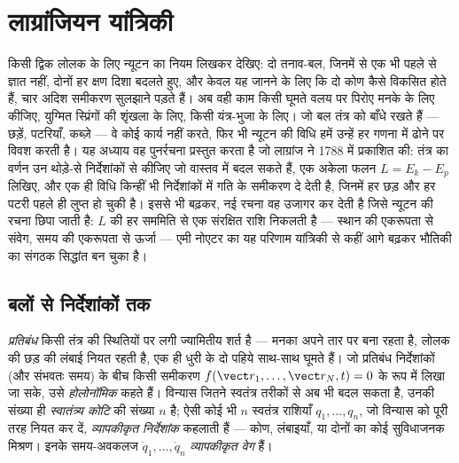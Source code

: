 \chapter{लाग्रांजियन यांत्रिकी}\label{ch:b3:lagrangian-mechanics}

किसी द्विक लोलक के लिए न्यूटन का नियम लिखकर देखिए: दो तनाव-बल, जिनमें
से एक भी पहले से ज्ञात नहीं, दोनों हर क्षण दिशा बदलते हुए, और केवल यह
जानने के लिए कि दो कोण कैसे विकसित होते हैं, चार अदिश समीकरण सुलझाने
पड़ते हैं। अब वही काम किसी घूमते वलय पर पिरोए मनके के लिए कीजिए, युग्मित
स्प्रिंगों की शृंखला के लिए, किसी यंत्र-भुजा के लिए। जो बल तंत्र को
बाँधे रखते हैं --- छड़ें, पटरियाँ, कब्ज़े --- वे कोई कार्य नहीं करते,
फिर भी न्यूटन की विधि हमें उन्हें हर गणना में ढोने पर विवश करती है। यह
अध्याय वह पुनर्रचना प्रस्तुत करता है जो लाग्रांज ने 1788 में प्रकाशित
की: तंत्र का वर्णन उन थोड़े-से निर्देशांकों से कीजिए जो वास्तव में बदल
सकते हैं, एक अकेला फलन $L = E_k - E_p$ लिखिए, और एक ही विधि किन्हीं भी
निर्देशांकों में गति के समीकरण दे देती है, जिनमें हर छड़ और हर पटरी पहले
ही लुप्त हो चुकी है। इससे भी बढ़कर, नई रचना वह उजागर कर देती है जिसे
न्यूटन की रचना छिपा जाती है: $L$ की हर सममिति से एक संरक्षित राशि निकलती
है --- स्थान की एकरूपता से संवेग, समय की एकरूपता से ऊर्जा --- एमी नोएटर
का यह परिणाम यांत्रिकी से कहीं आगे बढ़कर भौतिकी का संगठक सिद्धांत बन
चुका है।

\section{बलों से निर्देशांकों तक}

\begin{definition}[प्रतिबंध, स्वातंत्र्य कोटि, व्यापकीकृत निर्देशांक]\label{def:b3:lagrangian-mechanics:coordinates}
\emph{प्रतिबंध} किसी तंत्र की स्थितियों पर लगी ज्यामितीय शर्त है ---
मनका अपने तार पर बना रहता है, लोलक की छड़ की लंबाई नियत रहती है, एक ही
धुरी के दो पहिये साथ-साथ घूमते हैं। जो प्रतिबंध निर्देशांकों (और संभवतः
समय) के बीच किसी समीकरण
$f(\vect r_1, \dots, \vect r_N, t) = 0$ के रूप में लिखा जा सके, उसे
\emph{होलोनॉमिक} कहते हैं। विन्यास जितने स्वतंत्र तरीकों से अब भी बदल
सकता है, उनकी संख्या ही \emph{स्वातंत्र्य कोटि} की संख्या $n$ है; ऐसी
कोई भी $n$ स्वतंत्र राशियाँ $q_1, \dots, q_n$, जो विन्यास को पूरी तरह
नियत कर दें, \emph{व्यापकीकृत निर्देशांक} कहलाती हैं --- कोण, लंबाइयाँ,
या दोनों का कोई सुविधाजनक मिश्रण। इनके समय-अवकलज
$\dot q_1, \dots, \dot q_n$
\emph{व्यापकीकृत वेग} हैं।
\end{definition}

